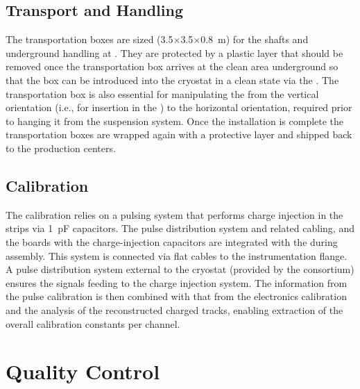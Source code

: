 \subsection{Transport and Handling}
\label{sec:fddp-crp-install-transport}

The transportation boxes are sized (\num{3.5}$\times$\num{3.5}$\times$\SI{0.8}{m}) for the shafts and underground handling at \surf{}.
They are protected by a plastic layer that should be removed once the transportation box arrives at the clean area 
underground so that the box can be introduced into the cryostat in a clean state via the . The transportation box is also essential for manipulating the  from the vertical orientation (i.e., for insertion in the ) to the horizontal orientation, required %
 prior to hanging it from the suspension system. Once the installation is complete the transportation boxes are wrapped again with a protective layer and shipped back to the production centers. 

\subsection{Calibration}
\label{sec:fddp-crp-install-calib}

The  calibration relies on a pulsing system that performs charge injection in the strips via \SI{1}{pF} capacitors. The pulse distribution system and related cabling, and the boards with the charge-injection capacitors are integrated  with the  during   assembly. This system is connected via flat cables to the instrumentation flange. A pulse distribution system external to the cryostat (provided by the  consortium) ensures the signals feeding to the charge injection system. 
The information from the pulse calibration is then combined
with that from the  electronics calibration and the analysis of the reconstructed charged tracks, enabling extraction of the overall calibration constants per channel.

\section{Quality Control}
\label{sec:fddp-crp-qc}

